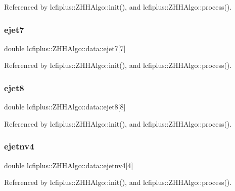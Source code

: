 Referenced by lcfiplus\+::\+Z\+H\+H\+Algo\+::init(), and lcfiplus\+::\+Z\+H\+H\+Algo\+::process().

\mbox{\label{structlcfiplus_1_1ZHHAlgo_1_1data_aca40fed7d68408d047c0c17abadbf25e}} 
\subsubsection{ejet7}
{\footnotesize\ttfamily double lcfiplus\+::\+Z\+H\+H\+Algo\+::data\+::ejet7[7]}



Referenced by lcfiplus\+::\+Z\+H\+H\+Algo\+::init(), and lcfiplus\+::\+Z\+H\+H\+Algo\+::process().

\mbox{\label{structlcfiplus_1_1ZHHAlgo_1_1data_a43766d98497a132d1c78448be5e8559c}} 
\subsubsection{ejet8}
{\footnotesize\ttfamily double lcfiplus\+::\+Z\+H\+H\+Algo\+::data\+::ejet8[8]}



Referenced by lcfiplus\+::\+Z\+H\+H\+Algo\+::init(), and lcfiplus\+::\+Z\+H\+H\+Algo\+::process().

\mbox{\label{structlcfiplus_1_1ZHHAlgo_1_1data_ac5cd57911c72382934b1aeb3f05d7099}} 
\subsubsection{ejetnv4}
{\footnotesize\ttfamily double lcfiplus\+::\+Z\+H\+H\+Algo\+::data\+::ejetnv4[4]}



Referenced by lcfiplus\+::\+Z\+H\+H\+Algo\+::init(), and lcfiplus\+::\+Z\+H\+H\+Algo\+::process().

\mbox{\label{structlcfiplus_1_1ZHHAlgo_1_1data_abd1ff0016051f4862341279d5b3a0412}} 
